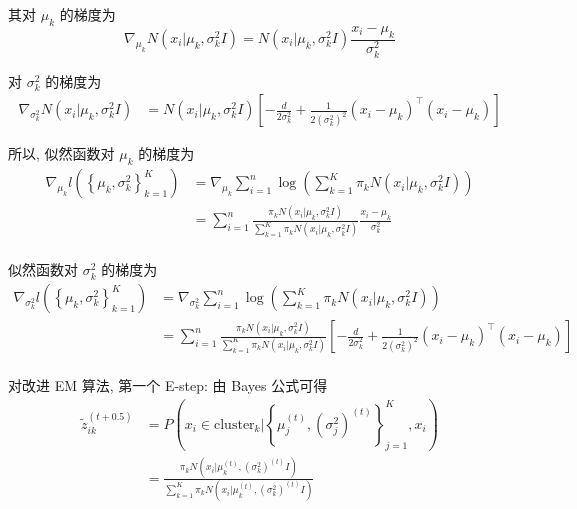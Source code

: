 \documentclass{article}
\begin{document}
其对 $\mu_k$ 的梯度为
\begin{equation}
  \nabla_{\mu_k}N(x_i|\mu_k,\sigma_k^2I)
  =N(x_i|\mu_k,\sigma_k^2I)\frac{x_i-\mu_k}{\sigma_k^2}
\end{equation}

对 $\sigma_k^2$ 的梯度为
\begin{equation}
  \begin{aligned}
    \nabla_{\sigma_k^2}N(x_i|\mu_k,\sigma_k^2I)
    &=N(x_i|\mu_k,\sigma_k^2I)\left[-\frac{d}{2\sigma_k^2}+\frac{1}{2(\sigma_k^2)^2}(x_i-\mu_k)^{\top}(x_i-\mu_k)\right]
  \end{aligned}
\end{equation}

所以, 似然函数对 $\mu_k$ 的梯度为
\begin{equation}
  \begin{aligned}
    \nabla_{\mu_k}l\left(\left\{\mu_k,\sigma_k ^2\right\}_{k=1}^K\right)
    &=\nabla_{\mu_k} \sum_{i=1}^n \log\left(\sum_{k=1}^K\pi_k N(x_i|\mu_k,\sigma_k^2I)\right)\\
    &=\sum_{i=1}^n\frac{\pi_k N(x_i|\mu_k,\sigma_k^2I)}{\displaystyle\sum_{k=1}^K\pi_k N(x_i|\mu_k,\sigma_k^2I)}\frac{x_i-\mu_k}{\sigma_k^2}\\
  \end{aligned}
\end{equation}

似然函数对 $\sigma_k^2$ 的梯度为
\begin{equation}
  \begin{aligned}
    \nabla_{\sigma_k^2}l\left(\left\{\mu_k,\sigma_k^2\right\}_{k=1}^K\right)
    &=\nabla_{\sigma_k^2} \sum_{i=1}^n \log\left(\sum_{k=1}^K\pi_k N(x_i|\mu_k,\sigma_k^2I)\right)\\
    &=\sum_{i=1}^n \frac{\pi_k N(x_i|\mu_k,\sigma_k^2I)}{\displaystyle\sum_{k=1}^K\pi_k N(x_i|\mu_k,\sigma_k^2I)}\left[-\frac{d}{2\sigma_k^2}+\frac{1}{2(\sigma_k^2)^2}(x_i-\mu_k)^{\top}(x_i-\mu_k)\right]\\
  \end{aligned}
\end{equation}

对改进 EM 算法, 第一个 E-step: 由 Bayes 公式可得
\begin{equation}
  \begin{aligned}
    \tilde{z}_{ik}^{(t+0.5)} 
    &=P\left(x_i\in \mathrm{cluster}_k \Big| \left\{\mu_j^{(t)},(\sigma_j^2)^{(t)}\right\}_{j=1}^K,x_i\right)\\
    &=\frac{\pi_k N\left(x_i\Big|\mu_k^{(t)},(\sigma_k^2)^{(t)}I\right)}{\displaystyle\sum_{k=1}^K\pi_k N\left(x_i\Big|\mu_k^{(t)},(\sigma_k^2)^{(t)}I\right)}
  \end{aligned}
\end{equation}
\end{document}
